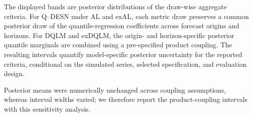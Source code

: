 The displayed bands are posterior distributions of the draw-wise aggregate criteria. For Q--DESN under AL and exAL, each metric draw preserves a common posterior draw of the quantile-regression coefficients across forecast origins and horizons. For DQLM and exDQLM, the origin- and horizon-specific posterior quantile marginals are combined using a pre-specified product coupling. The resulting intervals quantify model-specific posterior uncertainty for the reported criteria, conditional on the simulated series, selected specification, and evaluation design.

Posterior means were numerically unchanged across coupling assumptions, whereas interval widths varied; we therefore report the product-coupling intervals with this sensitivity analysis.
